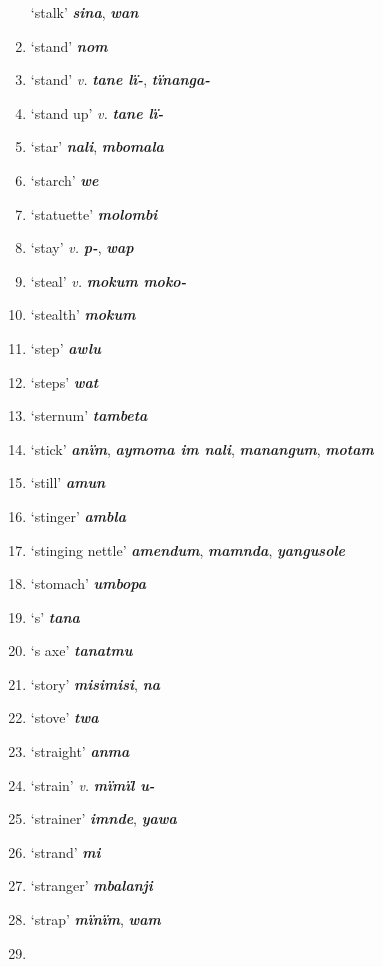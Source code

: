 \begin{enumerate}[noitemsep, label={}, align=left, widest=190, labelsep=1ex,leftmargin=*,itemindent=-10pt]
‘stalk’ \textbf{\textit{sina}}, \textbf{\textit{wan}} \item
‘stand’ \textbf{\textit{nom}} \item
‘stand’ \textit{v.} \textbf{\textit{tane lï-}}, \textbf{\textit{tïnanga-}} \item
‘stand up’ \textit{v.} \textbf{\textit{tane lï-}} \item
‘star’ \textbf{\textit{nali}}, \textbf{\textit{mbomala}} \item
‘starch’ \textbf{\textit{we}} \item
‘statuette’ \textbf{\textit{molombi}} \item
‘stay’ \textit{v.} \textbf{\textit{p-}}, \textbf{\textit{wap}} \item
‘steal’ \textit{v.} \textbf{\textit{mokum moko-}} \item
‘stealth’ \textbf{\textit{mokum}} \item
‘step’ \textbf{\textit{awlu}} \item
‘steps’ \textbf{\textit{wat}} \item
‘sternum’ \textbf{\textit{tambeta}} \item
‘stick’ \textbf{\textit{anïm}}, \textbf{\textit{aymoma im nali}}, \textbf{\textit{manangum}}, \textbf{\textit{motam}} \item
‘still’ \textbf{\textit{amun}} \item
‘stinger’ \textbf{\textit{ambla}} \item
‘stinging nettle’ \textbf{\textit{amendum}}, \textbf{\textit{mamnda}}, \textbf{\textit{yangusole}} \item
‘stomach’ \textbf{\textit{umbopa}} \item
‘s’ \textbf{\textit{tana}} \item
‘s axe’ \textbf{\textit{tanatmu}} \item
‘story’ \textbf{\textit{misimisi}}, \textbf{\textit{na}} \item
‘stove’ \textbf{\textit{twa}} \item
‘straight’ \textbf{\textit{anma}} \item
‘strain’ \textit{v.} \textbf{\textit{mïmïl u-}} \item
‘strainer’ \textbf{\textit{imnde}}, \textbf{\textit{yawa}} \item
‘strand’ \textbf{\textit{mi}} \item
‘stranger’ \textbf{\textit{mbalanji}} \item
‘strap’ \textbf{\textit{mïnïm}}, \textbf{\textit{wam}} \item

\end{enumerate}
